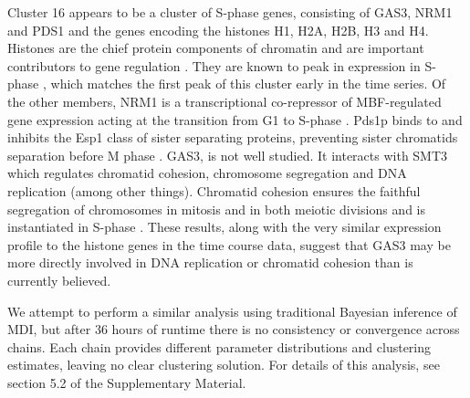 \documentclass{bioinfo}
\begin{document}
Cluster 16 appears to be a cluster of S-phase genes, consisting of GAS3, NRM1 and PDS1 and the genes encoding the histones H1, H2A, H2B, H3 and H4. Histones are the chief protein components of chromatin \citep{fischle2003histone} and are important contributors to gene regulation \citep{bannister2011regulation}. They are known to peak in expression in S-phase \citep{granovskaia2010high}, which matches the first peak of this cluster early in the time series. Of the other members, NRM1 is a transcriptional co-repressor of MBF-regulated gene expression acting at the transition from G1 to S-phase \citep{de2006constraining, aligianni2009fission}. Pds1p binds to and inhibits the Esp1 class of sister separating proteins, preventing sister chromatids separation before M phase \citep{ciosk1998esp1, toth1999yeast}. GAS3, is not well studied. It interacts with SMT3 which regulates chromatid cohesion, chromosome segregation and DNA replication (among other things). Chromatid cohesion ensures the faithful segregation of chromosomes in mitosis and in both meiotic divisions \citep{cooper2009pds1p} and is instantiated in S-phase \citep{toth1999yeast}. These results, along with the very similar expression profile to the histone genes in the time course data, suggest that GAS3 may be more directly involved in DNA replication or chromatid cohesion than is currently believed.

We attempt to perform a similar analysis using traditional Bayesian inference of MDI, but after 36 hours of runtime there is no consistency or convergence across chains. Each chain provides different parameter distributions and clustering estimates, leaving no clear clustering solution. For details of this analysis, see section 5.2 of the Supplementary Material.

\end{document}
